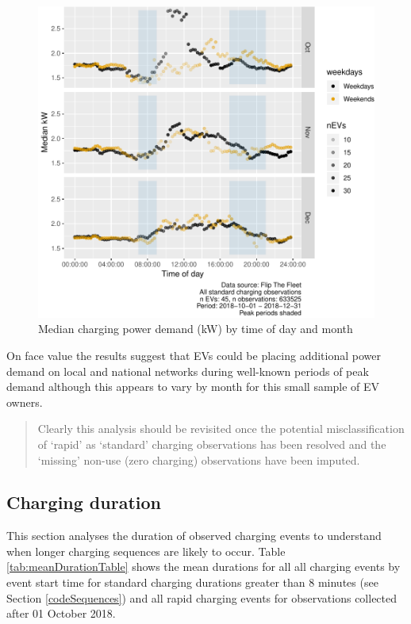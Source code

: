 \documentclass[]{article}
\begin{document}
\begin{figure}
\centering
\includegraphics{EVBB_report_v1_files/figure-latex/meanChargeByTimeMonth-1.pdf}
\caption{\label{fig:meanChargeByTimeMonth}Median charging power demand (kW) by time of day and month}
\end{figure}

On face value the results suggest that EVs could be placing additional power demand on local and national networks during well-known periods of peak demand although this appears to vary by month for this small sample of EV owners.

\begin{quote}
Clearly this analysis should be revisited once the potential misclassification of `rapid' as `standard' charging observations has been resolved and the `missing' non-use (zero charging) observations have been imputed.
\end{quote}

\hypertarget{duration}{%
\subsection{Charging duration}\label{duration}}

This section analyses the duration of observed charging events to understand when longer charging sequences are likely to occur. Table \ref{tab:meanDurationTable} shows the mean durations for all all charging events by event start time for standard charging durations greater than 8 minutes (see Section \ref{codeSequences}) and all rapid charging events for observations collected after 01 October 2018.
\end{document}
